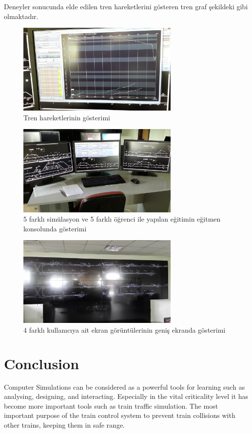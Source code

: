 \documentclass[conference]{IEEEtran}
\begin{document}
Deneyler sonucunda elde edilen tren hareketlerini gösteren tren graf şekildeki gibi olmaktadır. 
\begin{figure}[h!]
  \centering
  \includegraphics[width=8cm]{trenGrapSonuc.jpg}
  \caption{Tren hareketlerinin gösterimi}\label{fig:trenGrapSonuc}
  
\end{figure}
\begin{figure}[h!]
  \centering
  \includegraphics[width=8cm]{egitmenSonuc.jpg}
  \caption{5 farklı simülasyon ve 5 farklı öğrenci ile yapılan eğitimin eğitmen konsolunda gösterimi}\label{fig:egitmenSonuc}
  
\end{figure}
\begin{figure}[h!]
  \centering
  \includegraphics[width=8cm]{genisekranSonuc.jpg}
  \caption{4 farklı kullanıcıya ait ekran görüntülerinin geniş ekranda gösterimi}\label{fig:genisekranSonuc}
  
\end{figure}


\section{Conclusion}
Computer Simulations can be considered as a powerful tools for learning such as analysing, designing, and interacting. Especially in the vital criticality level it has become more important tools such as train traffic simulation.
The most important purpose of the train control system to prevent train collisions with other trains, keeping them in safe range.
\end{document}
